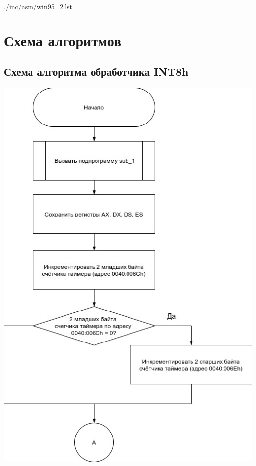 \documentclass[12pt]{extreport}
\begin{document}
\begin{lstinputlisting}[
	caption={Листинг процедуры sub\_1},
	label={lst:sub_1},
	style={asm}
]{./inc/asm/win95_2.lst}
\end{lstinputlisting}

\chapter{Схема алгоритмов}

\section{Схема алгоритма обработчика INT8h}

\begin{center}
\includegraphics[scale=0.6]{./inc/img/int8h_1.jpg} 

\end{center}
\end{document}
